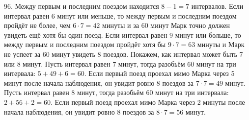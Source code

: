 96. Между первым и последним поездом находится $8-1=7$ интервалов. Если интервал равен 6 минут или меньше, то между первым и последним поездом пройдёт не более, чем $6\cdot7=42$ минуты и за 60 минут Марк точно должен увидеть ещё хотя бы один поезд. Если интервал равен 9 минут или больше, то между первым и последним поездом пройдёт хотя бы $9\cdot7=63$ минуты и Марк не успеет за 60 минут увидеть 8 поездов. Покажем, как интервал может быть 7 или 8 минут. Пусть интервал равен 7 минут, тогда разобьём 60 минут на три интервала: $5+49+6=60.$ Если первый поезд проехал мимо Марка через 5 минут после начала наблюдения, он увидит ровно 8 поездов за $7\cdot7=49$ минут. Пусть интервал равен 8 минут, тогда разобьём 60 минут на три интервала: $2+56+2=60.$ Если первый поезд проехал мимо Марка через 2 минуты после начала наблюдения, он увидит ровно 8 поездов за $8\cdot7=56$ минут.\\
